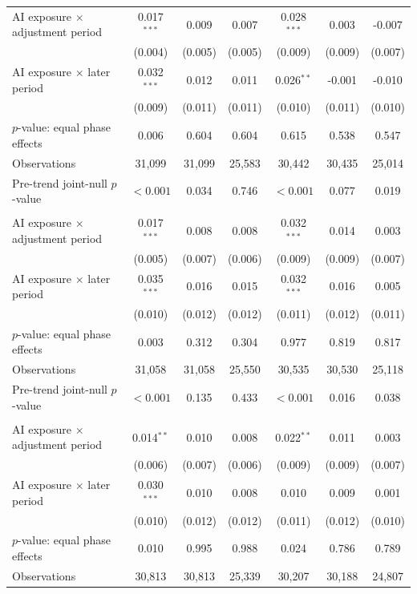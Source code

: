 \begin{table}[p]
\begin{threeparttable}
\begin{tabular}{@{}lcccccc@{}}
AI exposure $\times$ adjustment period & 0.017$^{***}$ & 0.009 & 0.007 & 0.028$^{***}$ & 0.003 & -0.007 \\
 & (0.004) & (0.005) & (0.005) & (0.009) & (0.009) & (0.007) \\
AI exposure $\times$ later period & 0.032$^{***}$ & 0.012 & 0.011 & 0.026$^{**}$ & -0.001 & -0.010 \\
 & (0.009) & (0.011) & (0.011) & (0.010) & (0.011) & (0.010) \\
$p$-value: equal phase effects & 0.006 & 0.604 & 0.604 & 0.615 & 0.538 & 0.547 \\
Observations & 31,099 & 31,099 & 25,583 & 30,442 & 30,435 & 25,014 \\
Pre-trend joint-null $p$-value & $<0.001$ & 0.034 & 0.746 & $<0.001$ & 0.077 & 0.019 \\
\addlinespace[1pt]
\multicolumn{7}{l}{\textbf{Panel D. Gender: men}} \\
AI exposure $\times$ adjustment period & 0.017$^{***}$ & 0.008 & 0.008 & 0.032$^{***}$ & 0.014 & 0.003 \\
 & (0.005) & (0.007) & (0.006) & (0.009) & (0.009) & (0.007) \\
AI exposure $\times$ later period & 0.035$^{***}$ & 0.016 & 0.015 & 0.032$^{***}$ & 0.016 & 0.005 \\
 & (0.010) & (0.012) & (0.012) & (0.011) & (0.012) & (0.011) \\
$p$-value: equal phase effects & 0.003 & 0.312 & 0.304 & 0.977 & 0.819 & 0.817 \\
Observations & 31,058 & 31,058 & 25,550 & 30,535 & 30,530 & 25,118 \\
Pre-trend joint-null $p$-value & $<0.001$ & 0.135 & 0.433 & $<0.001$ & 0.016 & 0.038 \\
\addlinespace[1pt]
\multicolumn{7}{l}{\textbf{Panel E. Gender: women}} \\
AI exposure $\times$ adjustment period & 0.014$^{**}$ & 0.010 & 0.008 & 0.022$^{**}$ & 0.011 & 0.003 \\
 & (0.006) & (0.007) & (0.006) & (0.009) & (0.009) & (0.007) \\
AI exposure $\times$ later period & 0.030$^{***}$ & 0.010 & 0.008 & 0.010 & 0.009 & 0.001 \\
 & (0.010) & (0.012) & (0.012) & (0.011) & (0.012) & (0.010) \\
$p$-value: equal phase effects & 0.010 & 0.995 & 0.988 & 0.024 & 0.786 & 0.789 \\
Observations & 30,813 & 30,813 & 25,339 & 30,207 & 30,188 & 24,807 \\

\end{tabular}
\end{threeparttable}
\end{table}
